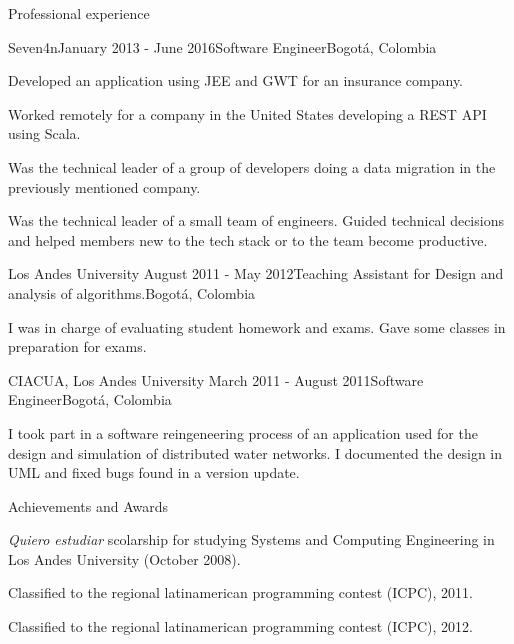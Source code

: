 \documentclass{resume} %
\def\uniandes{Los Andes University }
\begin{document}
\begin{rSection}{Professional experience}

\begin{rSubsection}{Seven4n}{January 2013 - June 2016}{Software Engineer}{Bogot\'a, Colombia}
\item Developed an application using JEE and GWT for an insurance company.
\item Worked remotely for a company in the United States developing a REST API using Scala.
\item Was the technical leader of a group of developers doing a data migration in the previously mentioned company.
\item Was the technical leader of a small team of engineers. Guided technical decisions and helped members new to the tech stack or to the team become productive.
\end{rSubsection}


\begin{rSubsection}{\uniandes}{August 2011 - May 2012}{Teaching Assistant for Design and analysis of algorithms.}{Bogot\'a, Colombia}
\item I was in charge of evaluating student homework and exams. Gave some classes in preparation for exams.
\end{rSubsection}


\begin{rSubsection}{CIACUA, \uniandes}{March 2011 - August 2011}{Software Engineer}{Bogot\'a, Colombia}
\item I took part in a software reingeneering process of an application used for the design and simulation of distributed water networks. I documented the design in UML and fixed bugs found in a version update.
\end{rSubsection}

\end{rSection}

\begin{rSection}{Achievements and Awards}
\begin{rSubsection}{}{}{}{}
\item \textsl{Quiero estudiar} scolarship for studying Systems and Computing Engineering in Los Andes University (October 2008).
\item Classified to the regional latinamerican programming contest (ICPC), 2011.
\item Classified to the regional latinamerican programming contest (ICPC), 2012.
\end{rSubsection}
\end{rSection}
\end{document}
